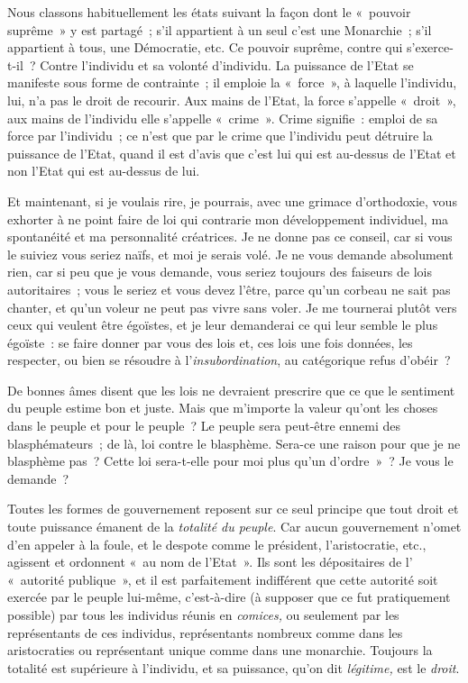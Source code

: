 \documentclass[french,twoside]{book} %
\begin{document}
Nous classons habituellement les états suivant la façon dont le « pouvoir suprême » y est partagé ; s’il appartient à un seul c’est une Monarchie ; s’il appartient à tous, une Démocratie, etc. Ce pouvoir suprême, contre qui s’exerce-t-il ? Contre l’individu et sa volonté d’individu. La puissance de l’Etat se manifeste sous forme de contrainte ; il emploie la « force », à laquelle l’individu, lui, n’a pas le droit de recourir. Aux mains de l’Etat, la force s’appelle « droit », aux mains de l’individu elle s’appelle « crime ». Crime signifie : emploi de sa force par l’individu ; ce n’est que par le crime que l’individu peut détruire la puissance de l’Etat, quand il est d’avis que c’est lui qui est au-dessus de l’Etat et non l’Etat qui est au-dessus de lui.\par
Et maintenant, si je voulais rire, je pourrais, avec une grimace d’orthodoxie, vous exhorter à ne point faire de loi qui contrarie mon développement individuel, ma spontanéité et ma personnalité créatrices. Je ne donne pas ce conseil, car si vous le suiviez vous seriez naïfs, et moi je serais volé. Je ne vous demande absolument rien, car si peu que je vous demande, vous seriez toujours des faiseurs de lois autoritaires ; vous le seriez et vous devez l’être, parce qu’un corbeau ne sait pas chanter, et qu’un voleur ne peut pas vivre sans voler. Je me tournerai plutôt vers ceux qui veulent être égoïstes, et je leur demanderai ce qui leur semble le plus égoïste : se faire donner par vous des lois et, ces lois une fois données, les respecter, ou bien se résoudre à l’\emph{insubordination}, au catégorique refus d’obéir ?\par
De bonnes âmes disent que les lois ne devraient prescrire que ce que le sentiment du peuple estime bon et juste. Mais que m’importe la valeur qu’ont les choses dans le peuple et pour le peuple ? Le peuple sera peut-être ennemi des blasphémateurs ; de là, loi  contre le blasphème. Sera-ce une raison pour que je ne blasphème pas ? Cette loi sera-t-elle pour moi plus qu’un d’ordre » ? Je vous le demande ?\par
Toutes les formes de gouvernement reposent sur ce seul principe que tout droit et toute puissance émanent de la \emph{totalité du peuple}. Car aucun gouvernement n’omet d’en appeler à la foule, et le despote comme le président, l’aristocratie, etc., agissent et ordonnent « au nom de l’Etat ». Ils sont les dépositaires de l’ « autorité publique », et il est parfaitement indifférent que cette autorité soit exercée par le peuple lui-même, c’est-à-dire (à supposer que ce fut pratiquement possible) par tous les individus réunis en \emph{comices,} ou seulement par les représentants de ces individus, représentants nombreux comme dans les aristocraties ou représentant unique comme dans une monarchie. Toujours la totalité est supérieure à l’individu, et sa puissance, qu’on dit \emph{légitime,} est le \emph{droit}.\par
\end{document}
